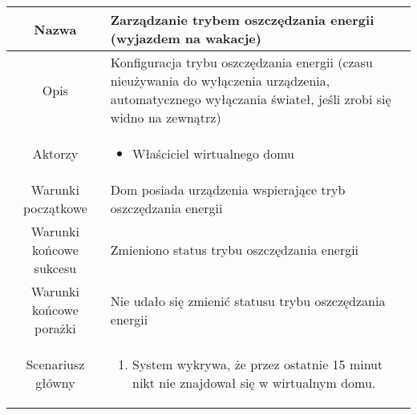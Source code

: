 \documentclass{article}
\begin{document}
\begin{enumerate}
\begin{enumerate}
				\begin{table}[H]
					\centering
					\begin{tabular}{|c|p{7cm}|}
						\hline
						Nazwa                   & Zarządzanie trybem oszczędzania energii (wyjazdem na wakacje)                                                                                                                                                                                                          \\
						\hline
						Opis                    & Konfiguracja trybu oszczędzania energii (czasu nieużywania do wyłączenia urządzenia, automatycznego wyłączania świateł, jeśli zrobi się widno na zewnątrz)                                                                                                             \\
						\hline
						Aktorzy                 & \begin{itemize}\item Właściciel wirtualnego domu\end{itemize}                                                                                                                                                                                                          \\
						\hline
						Warunki początkowe      & Dom posiada urządzenia wspierające tryb oszczędzania energii                                                                                                                                                                                                           \\
						\hline
						Warunki końcowe sukcesu & Zmieniono status trybu oszczędzania energii                                                                                                                                                                                                                            \\
						\hline
						Warunki końcowe porażki & Nie udało się zmienić statusu trybu oszczędzania energii                                                                                                                                                                                                               \\
						\hline
						Scenariusz główny       & \begin{enumerate}\item System wykrywa, że przez ostatnie 15 minut nikt nie znajdował się w wirtualnym domu.


\end{enumerate}
\end{tabular}
\end{table}
\end{enumerate}
\end{enumerate}
\end{document}

